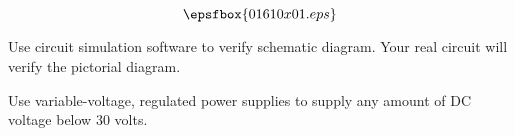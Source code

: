

$$\epsfbox{01610x01.eps}$$

\vfil \eject






Use circuit simulation software to verify schematic diagram.  Your real circuit will verify the pictorial diagram.







Use variable-voltage, regulated power supplies to supply any amount of DC voltage below 30 volts.




